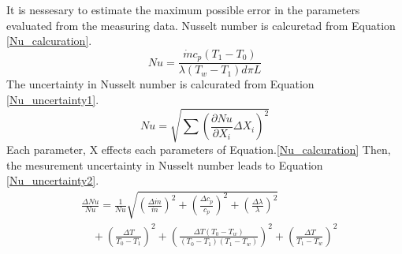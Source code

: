 \documentclass[conference]{IEEEtran}
\begin{document}
It is nessesary to estimate the maximum possible error in the parameters evaluated from the measuring data.
Nusselt number is calcuretad from Equation \ref{Nu_calcuration}.
\begin{equation}
    Nu=\frac{\dot{m} c_{p}(T_{1}-T_{0})}{\lambda (T_{w}-T_{1}) d\pi L}\label{Nu_calcuration}
\end{equation}
The uncertainty in Nusselt number is calcurated from Equation \ref{Nu_uncertainty1}.
\begin{equation}
    Nu=\sqrt{\sum \left(\frac{\partial Nu}{\partial X_{i}} \Delta X_{i}\right)^{2}}\label{Nu_uncertainty1}
\end{equation}
Each parameter, X effects each parameters of Equation.\ref{Nu_calcuration}
Then, the mesurement uncertainty in Nusselt number leads to Equation \ref{Nu_uncertainty2}.
\begin{equation}
    \begin{split}
        &\frac{\Delta Nu}{Nu} =\frac{1}{Nu}\sqrt{\left(\frac{\Delta \dot{m}}{\dot{m}}\right)^{2}+\left(\frac{\Delta c_{p}}{c_{p}}\right)^{2}+\left(\frac{\Delta \lambda}{\lambda}\right)^{2}}\\
        &\quad +\left(\frac{\Delta T}{T_{0}-T_{1}}\right)^{2}+\left(\frac{\Delta T(T_{0}-T_{w})}{(T_{0}-T_{1})(T_{1}-T_{w})}\right)^{2}+\left(\frac{\Delta T}{T_{1}-T_{w}}\right)^{2}\\\label{Nu_uncertainty2}
    \end{split}
\end{equation}
\end{document}
